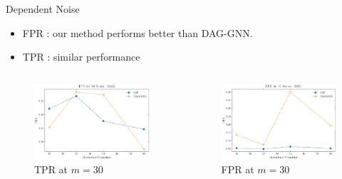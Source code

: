 \documentclass{beamer}
\begin{document}
\begin{frame}[allowframebreaks]{Dependent Noise}
    \begin{itemize}
        \item FPR : our method performs better than DAG-GNN.\\
        \item TPR : similar performance
    \end{itemize}

    \begin{columns}
        \begin{column}{0.5\textwidth}
            \begin{figure}
            \centering
            \includegraphics[scale=0.4]{fig/TPR_dependence_30_DAG_threshold0.3.pdf}
            \caption{TPR at $m=30$}
            \label{fig:dep_gaussian_tpr_30}
            \end{figure}
        \end{column}
        \begin{column}{0.5\textwidth}
            \begin{figure}
            \centering
            \includegraphics[scale=0.4]{fig/FPR_dependence_30_DAG_threshold0.3.pdf}
            \caption{FPR at $m=30$}
            \label{fig:dep_gaussian_fpr_30}
            \end{figure}
        \end{column}
    \end{columns}
\end{frame}
\end{document}
